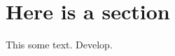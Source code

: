 \documentclass{article}
\begin{document}
\section{Here is a section}
This some text. Develop.
\end{document}
